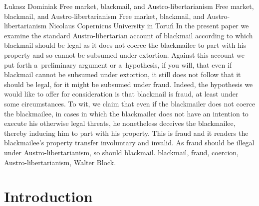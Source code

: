 \begin{artengenv}{Łukasz Dominiak}
	{Free market, blackmail, and Austro-libertarianism}
	{Free market, blackmail, and Austro-libertarianism}
	{Free market, blackmail, and Austro-libertarianism}
	{Nicolaus Copernicus University in Toruń\label{dominiak-first}}
	{In the present paper we examine the standard Austro-libertarian account of blackmail according to which blackmail should be legal as it does not coerce the blackmailee to part with his property and so cannot be subsumed under extortion. Against this account we put forth a~preliminary argument or a~hypothesis, if you will, that even if blackmail cannot be subsumed under extortion, it still does not follow that it should be legal, for it might be subsumed under fraud. Indeed, the hypothesis we would like to offer for consideration is that blackmail is fraud, at least under some circumstances. To wit, we claim that even if the blackmailer does not coerce the blackmailee, in cases in which the blackmailer does not have an intention to execute his otherwise legal threats, he nonetheless deceives the blackmailee, thereby inducing him to part with his property. This is fraud and it renders the blackmailee's property transfer involuntary and invalid. As fraud should be illegal under Austro-libertarianism, so should blackmail.
	}
	{blackmail, fraud, coercion, Austro-libertarianism, Walter Block.}






\section{Introduction}


\end{artengenv}
